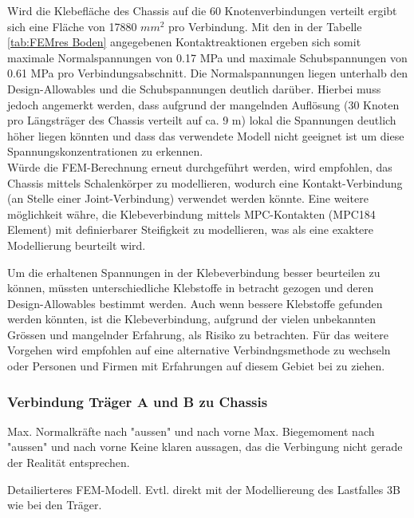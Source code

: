 Wird die Klebefläche des Chassis auf die 60 Knotenverbindungen verteilt ergibt sich eine Fläche von 17880 $mm^2$ pro Verbindung. Mit den in der Tabelle \ref{tab:FEMres Boden} angegebenen Kontaktreaktionen ergeben sich somit maximale Normalspannungen von 0.17 MPa und maximale Schubspannungen von 0.61 MPa pro Verbindungsabschnitt. Die Normalspannungen liegen unterhalb den Design-Allowables und die Schubspannungen deutlich darüber. Hierbei muss jedoch angemerkt werden, dass aufgrund der mangelnden Auflösung (30 Knoten pro Längsträger des Chassis verteilt auf ca. 9 m) lokal die Spannungen deutlich höher liegen könnten und dass das verwendete Modell nicht geeignet ist um diese Spannungskonzentrationen zu erkennen.\\
Würde die FEM-Berechnung erneut durchgeführt werden, wird empfohlen, das Chassis mittels Schalenkörper zu modellieren, wodurch eine Kontakt-Verbindung (an Stelle einer Joint-Verbindung) verwendet werden könnte. Eine weitere möglichkeit währe, die Klebeverbindung mittels MPC-Kontakten (MPC184 Element) mit definierbarer Steifigkeit zu modellieren, was als eine exaktere Modellierung beurteilt wird.

Um die erhaltenen Spannungen in der Klebeverbindung besser beurteilen zu können, müssten unterschiedliche Klebstoffe in betracht gezogen und deren Design-Allowables bestimmt werden. Auch wenn bessere Klebstoffe gefunden werden könnten, ist die Klebeverbindung, aufgrund der vielen unbekannten Grössen und mangelnder Erfahrung, als Risiko zu betrachten. Für das weitere Vorgehen wird empfohlen auf eine alternative Verbindngsmethode zu wechseln oder Personen und Firmen mit Erfahrungen auf diesem Gebiet bei zu ziehen.


\subsubsection{Verbindung Träger A und B zu Chassis}

Max. Normalkräfte nach "aussen" und nach vorne
Max. Biegemoment nach "aussen" und nach vorne
Keine klaren aussagen, das die Verbingung nicht gerade der Realität entsprechen.

Detailierteres FEM-Modell.
Evtl. direkt mit der Modelliereung des Lastfalles 3B wie bei den Träger.




